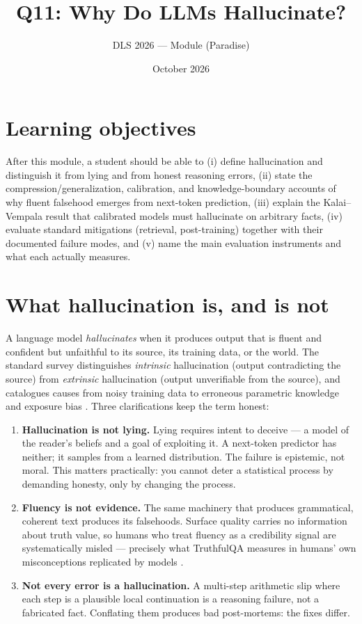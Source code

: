 \documentclass[11pt]{article}
\title{Q11: Why Do LLMs Hallucinate?}
\author{DLS 2026 --- Module (Paradise)}
\date{October 2026}
\begin{document}
\maketitle

\section*{Learning objectives}
After this module, a student should be able to (i) define hallucination and distinguish it from lying and from honest reasoning errors, (ii) state the compression/generalization, calibration, and knowledge-boundary accounts of why fluent falsehood emerges from next-token prediction, (iii) explain the Kalai--Vempala result that calibrated models must hallucinate on arbitrary facts, (iv) evaluate standard mitigations (retrieval, post-training) together with their documented failure modes, and (v) name the main evaluation instruments and what each actually measures.

\section{What hallucination is, and is not}
A language model \emph{hallucinates} when it produces output that is fluent and confident but unfaithful to its source, its training data, or the world. The standard survey distinguishes \emph{intrinsic} hallucination (output contradicting the source) from \emph{extrinsic} hallucination (output unverifiable from the source), and catalogues causes from noisy training data to erroneous parametric knowledge and exposure bias \cite{ji2023survey}. Three clarifications keep the term honest:

\begin{enumerate}[noitemsep]
  \item \textbf{Hallucination is not lying.} Lying requires intent to deceive --- a model of the reader's beliefs and a goal of exploiting it. A next-token predictor has neither; it samples from a learned distribution. The failure is epistemic, not moral. This matters practically: you cannot deter a statistical process by demanding honesty, only by changing the process.
  \item \textbf{Fluency is not evidence.} The same machinery that produces grammatical, coherent text produces its falsehoods. Surface quality carries no information about truth value, so humans who treat fluency as a credibility signal are systematically misled --- precisely what TruthfulQA measures in humans' own misconceptions replicated by models \cite{lin2022truthfulqa}.
  \item \textbf{Not every error is a hallucination.} A multi-step arithmetic slip where each step is a plausible local continuation is a reasoning failure, not a fabricated fact. Conflating them produces bad post-mortems: the fixes differ.
\end{enumerate}
\end{document}

